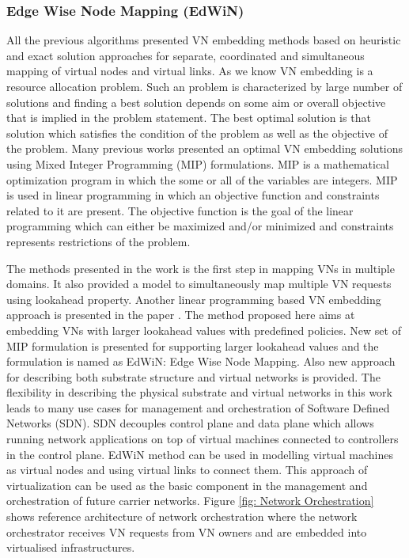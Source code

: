 \documentclass[article,dr=phil,type=msc ,colorback,accentcolor=tud4b]{tudthesis}
\begin{document}
\subsubsection{Edge Wise Node Mapping (EdWiN)} \label{edwin}

All the previous algorithms presented VN embedding methods based on heuristic and exact solution approaches for separate, coordinated and simultaneous mapping of virtual nodes and virtual links. As we know VN embedding is a resource allocation problem. Such an problem is characterized by large number of solutions and finding a best solution depends on some aim or overall objective that is implied in the problem statement. The best optimal solution is that solution which satisfies the condition of the problem as well as the objective of the problem. \newline
Many previous works presented an optimal VN embedding solutions using Mixed Integer Programming (MIP) formulations. MIP is a mathematical optimization program in which the some or all of the variables are integers. MIP is used in linear programming in which an objective function and constraints related to it are present. The objective function is the goal of the linear programming which can either be maximized and/or minimized and constraints represents restrictions of the problem.

The methods presented in the work \cite{vn_multiple} is the first step in mapping VNs in multiple domains. It also provided a model to simultaneously map multiple VN requests using lookahead property. Another linear programming based VN embedding approach is presented in the paper \cite{vneapproach}. The method proposed here aims at embedding VNs with larger lookahead values with predefined policies. New set of MIP formulation is presented for supporting larger lookahead values and the formulation is named as EdWiN: Edge Wise Node Mapping. Also new approach for describing both substrate structure and virtual networks is provided. The flexibility in describing the physical substrate and virtual networks in this work leads to many use cases for management and orchestration of Software Defined Networks (SDN). SDN decouples control plane and data plane which allows running network applications on top of virtual machines connected to controllers in the control plane. EdWiN method can be used in modelling virtual machines as virtual nodes and using virtual links to connect them. This approach of virtualization can be used as the basic component in the management and orchestration of future carrier networks. Figure \ref{fig: Network Orchestration} shows reference architecture of network orchestration where the network
orchestrator receives VN requests from VN owners and are embedded into virtualised infrastructures.\newline
\end{document}
